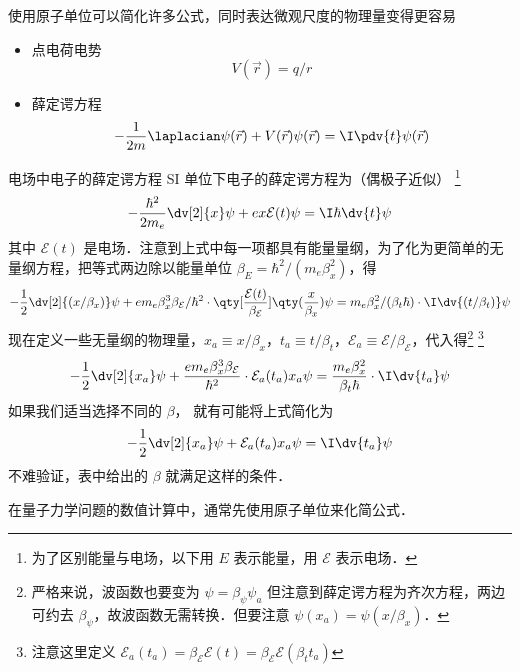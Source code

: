 使用原子单位可以简化许多公式，同时表达微观尺度的物理量变得更容易
\begin{itemize}
\item 点电荷电势
\begin{equation}
V(\vec r) = q/r
\end{equation}
\item 薛定谔方程  
\begin{equation}
-\frac{1}{2m}\laplacian\psi(\vec r) + V(\vec r)\psi(\vec r) = \I\pdv{t} \psi(\vec r)
\end{equation}
\end{itemize}



\begin{exam}{电场中电子的薛定谔方程} %
SI 单位下电子的薛定谔方程为（偶极子近似） \footnote{为了区别能量与电场，以下用 $E$ 表示能量，用 $\mathcal{E}$ 表示电场．} 
\begin{equation}
-\frac{\hbar^2}{2m_e} \dv[2]{x} \psi + e x\mathcal{E}(t)\psi= \I\hbar \dv{t} \psi
\end{equation}
其中 $\mathcal{E}(t)$ 是电场．注意到上式中每一项都具有能量量纲，为了化为更简单的无量纲方程，把等式两边除以能量单位 $\beta_E= \hbar^2/(m_e\beta_x^2)$，得
\begin{equation}\label{AU_eq3}
-\frac12 \dv[2]{(x/\beta_x)} \psi + e m_e\beta_x^3\beta_\mathcal{E}/\hbar^2 \cdot \qty[\frac{\mathcal{E}(t)}{\beta_\mathcal{E}}] \qty(\frac{x}{\beta_x})\psi= m_e\beta_x^2/(\beta_t\hbar)\cdot\I \dv{(t/\beta_t)}\psi
\end{equation}
现在定义一些无量纲的物理量，$x_a \equiv x/\beta_x$，$t_a \equiv t/\beta_t$，$\mathcal{E}_a \equiv \mathcal{E}/\beta_\mathcal{E}$，代入得\footnote{严格来说，波函数也要变为 $\psi=\beta_\psi\psi_a$ 但注意到薛定谔方程为齐次方程，两边可约去 $\beta_\psi$，故波函数无需转换．但要注意 $\psi(x_a) = \psi(x/\beta_x)$．} \footnote{注意这里定义 $\mathcal{E}_a(t_a)=\beta_\mathcal{E}\mathcal{E}(t)=\beta_\mathcal{E}\mathcal{E}(\beta_t t_a)$}
\begin{equation}\label{AU_eq2}
-\frac12 \dv[2]{x_a} \psi + \frac{e m_e\beta_x^3\beta_\mathcal{E}}{\hbar^2}\cdot \mathcal{E}_a(t_a) x_a\psi= \frac{m_e\beta_x^2}{\beta_t\hbar}\cdot\I \dv{t_a}\psi
\end{equation}
如果我们适当选择不同的 $\beta$， 就有可能将上式简化为
\begin{equation}\label{AU_eq1}
-\frac12 \dv[2]{x_a}\psi +\mathcal{E}_a(t_a) x_a\psi= \I \dv{t_a}\psi
\end{equation}
不难验证，表中给出的 $\beta$ 就满足这样的条件．

在量子力学问题的数值计算中，通常先使用原子单位来化简公式．
\end{exam}

